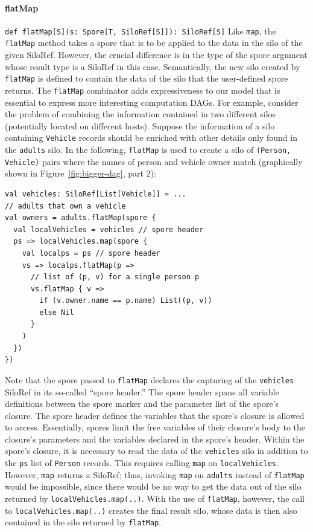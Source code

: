 \documentclass{jfp1}
\begin{document}
\paragraph{flatMap}%
%
\texttt{def flatMap[S](s: Spore[T, SiloRef[S]]): SiloRef[S]} \newline
%
Like \verb|map|, the \verb|flatMap| method takes a spore that is to be applied
to the data in the silo of the given SiloRef. However, the crucial difference is
in the type of the spore argument whose result type is a SiloRef in this case.
Semantically, the new silo created by \verb|flatMap| is defined to contain the
data of the silo that the user-defined spore returns.  The \verb|flatMap|
combinator adds expressiveness to our model that is essential to express more
interesting computation DAGs. For example, consider the problem of combining the
information contained in two different silos (potentially located on different
hosts). Suppose the information of a silo containing \verb|Vehicle| records
should be enriched with other details only found in the \verb|adults| silo. In
the following, \verb|flatMap| is used to create a silo of \verb|(Person, Vehicle)|
pairs where the names of person and vehicle owner match (graphically shown in
Figure~\ref{fig:bigger-dag}, part 2):

\begin{lstlisting}
val vehicles: SiloRef[List[Vehicle]] = ...
// adults that own a vehicle
val owners = adults.flatMap(spore {
  val localVehicles = vehicles // spore header
  ps => localVehicles.map(spore {
    val localps = ps // spore header
    vs => localps.flatMap(p =>
      // list of (p, v) for a single person p
      vs.flatMap { v => 
        if (v.owner.name == p.name) List((p, v))
        else Nil
      }
    )
  })
})
\end{lstlisting}
\noindent
Note that the spore passed to \verb|flatMap| declares the capturing of the
\verb|vehicles| SiloRef in its so-called ``spore header.'' The spore header
spans all variable definitions between the spore marker and the parameter list
of the spore's closure. The spore header defines the variables that the spore's
closure is allowed to access. Essentially, spores limit the free variables of
their closure's body to the closure's parameters and the variables declared in
the spore's header. Within the spore's closure, it is necessary to read the data
of the \verb|vehicles| silo in addition to the \verb|ps| list of \verb|Person|
records. This requires calling \verb|map| on \verb|localVehicles|. However,
\verb|map| returns a SiloRef; thus, invoking \verb|map| on \verb|adults| instead
of \verb|flatMap| would be impossible, since there would be no way to get the
data out of the silo returned by \verb|localVehicles.map(..)|. With the use of
\verb|flatMap|, however, the call to \verb|localVehicles.map(..)| creates the
final result silo, whose data is then also contained in the silo returned by
\verb|flatMap|.
\end{document}
